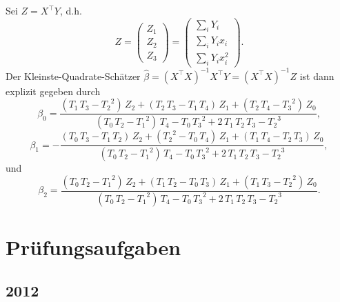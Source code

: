 Sei $Z = X^\top Y$, d.h.\
\begin{equation*}
    Z = \left(
    \begin{array}{c}
        Z_1 \\ Z_2 \\ Z_3
    \end{array}
    \right) = \left(
    \begin{array}{c}
        \sum_{i}^{} Y_i \\ \sum_{i}^{} Y_i x_i \\ \sum_{i} Y_i x_i^2
    \end{array}
    \right).
\end{equation*}
Der Kleinste-Quadrate-Schätzer 
$\hat \beta = \left( X^\top X \right)^{-1} X^\top Y = \left( X^\top X \right)^{-1} Z$ ist dann explizit
gegeben durch
\begin{equation*}
    \beta_0 = 
\frac{\left({ T_1}\,{ T_3}-{ T_2}^2\right)\,{ Z_2}+
 \left({ T_2}\,{ T_3}-{ T_1}\,{ T_4}\right)\,{ Z_1}+
 \left({ T_2}\,{ T_4}-{ T_3}^2\right)\,{ Z_0}}{
 \left({ T_0}\,{ T_2}-{ T_1}^2\right)\,{ T_4}-{ T_0}\,
 { T_3}^2+2\,{ T_1}\,{ T_2}\,{ T_3}-{ T_2}^3},
\end{equation*}
\begin{equation*}
    \beta_1 = 
-  \frac{\left({ T_0}\,{ T_3}-{ T_1}\,{ T_2}\right)\,
 { Z_2}+\left({ T_2}^2-{ T_0}\,{ T_4}\right)\,{ Z_1}+
 \left({ T_1}\,{ T_4}-{ T_2}\,{ T_3}\right)\,{ Z_0}
 }{\left({ T_0}\,{ T_2}-{ T_1}^2\right)\,{ T_4}-
 { T_0}\,{ T_3}^2+2\,{ T_1}\,{ T_2}\,{ T_3}-{ T_2}^
 3},
\end{equation*}
und
\begin{equation*}
    \beta_2 = 
 \frac{\left({ T_0}\,{ T_2}-{ T_1}^2\right)\,{ Z_2}+
 \left({ T_1}\,{ T_2}-{ T_0}\,{ T_3}\right)\,{ Z_1}+
 \left({ T_1}\,{ T_3}-{ T_2}^2\right)\,{ Z_0}}{
 \left({ T_0}\,{ T_2}-{ T_1}^2\right)\,{ T_4}-{ T_0}\,
 { T_3}^2+2\,{ T_1}\,{ T_2}\,{ T_3}-{ T_2}^3}.
\end{equation*}



\section{Prüfungsaufgaben}
\subsection{2012}

